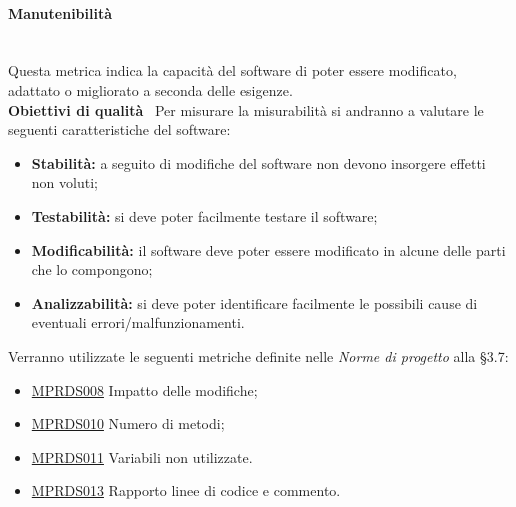 \paragraph{Manutenibilità}\mbox{}\\[0.4cm]
Questa metrica indica la capacità del software di poter essere modificato, adattato o migliorato a seconda delle esigenze.\\[0.4cm]
\textbf{Obiettivi di qualità} \ Per misurare la misurabilità si andranno a valutare le seguenti caratteristiche del software:
\begin{itemize}
	\item \textbf{Stabilità:} a seguito di modifiche del software non devono insorgere effetti non voluti;
	\item \textbf{Testabilità:} si deve poter facilmente testare il software;
	\item \textbf{Modificabilità:} il software deve poter essere modificato in alcune delle parti che lo compongono;
	\item \textbf{Analizzabilità:} si deve poter identificare facilmente le possibili cause di eventuali errori/malfunzionamenti.
\end{itemize}
Verranno utilizzate le seguenti metriche definite nelle \textit{Norme di progetto} alla §3.7:
\begin{itemize}
	\item \hyperref[sec:qualita_software]{MPRDS008} Impatto delle modifiche;
	\item \hyperref[sec:qualita_software]{MPRDS010} Numero di metodi;
	\item \hyperref[sec:qualita_software]{MPRDS011} Variabili non utilizzate.
	\item \hyperref[sec:qualita_software]{MPRDS013} Rapporto linee di codice e commento.
\end{itemize}
\clearpage
